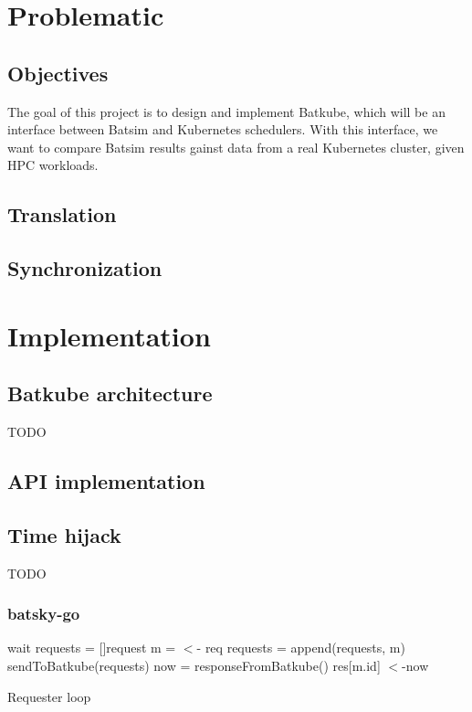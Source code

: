 \documentclass[12pt, a4paper]{memoir}
\begin{document}
\chapter{Problematic}

\section{Objectives}

The goal of this project is to design and implement Batkube, which will be an
interface between Batsim and Kubernetes schedulers. With this interface, we
want to compare Batsim results gainst data from a real Kubernetes cluster,
given HPC workloads.

\section{Translation}

\section{Synchronization}

\chapter{Implementation}

\section{Batkube architecture}
TODO

\section{API implementation}
\section{Time hijack}
TODO

\subsection{batsky-go}


\begin{algorithm}[H]
\DontPrintSemicolon
{}
 {
	wait\;
}
requests = []request\;
 {
	m = $<$- req 
	requests = append(requests, m)\;
}
sendToBatkube(requests) 
now = responseFromBatkube()\;
 {
	res[m.id] $<$-now 
}

	
\caption{Requester loop}
\label{alg:reqLoop}
\end{algorithm}
\end{document}
